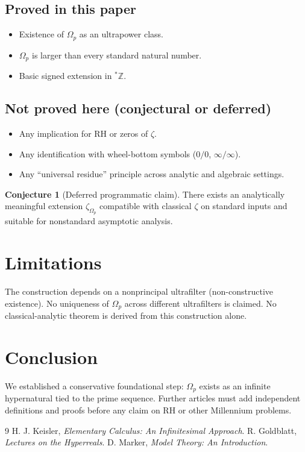 \documentclass[11pt]{article}
\theoremstyle{definition}
\newtheorem{conjecture}[definition]{Conjecture}
\theoremstyle{plain}
\begin{document}
\subsection*{Proved in this paper}
\begin{itemize}
\item Existence of \(\Omega_p\) as an ultrapower class.
\item \(\Omega_p\) is larger than every standard natural number.
\item Basic signed extension in \({}^\ast\mathbb Z\).
\end{itemize}

\subsection*{Not proved here (conjectural or deferred)}
\begin{itemize}
\item Any implication for RH or zeros of \(\zeta\).
\item Any identification with wheel-bottom symbols (\(0/0\), \(\infty/\infty\)).
\item Any ``universal residue'' principle across analytic and algebraic settings.
\end{itemize}

\begin{conjecture}[Deferred programmatic claim]
There exists an analytically meaningful extension \(\zeta_{\Omega_p}\) compatible with classical \(\zeta\) on standard inputs and suitable for nonstandard asymptotic analysis.
\end{conjecture}

\section{Limitations}
The construction depends on a nonprincipal ultrafilter (non-constructive existence).
No uniqueness of \(\Omega_p\) across different ultrafilters is claimed.
No classical-analytic theorem is derived from this construction alone.

\section{Conclusion}
We established a conservative foundational step: \(\Omega_p\) exists as an infinite hypernatural tied to the prime sequence.
Further articles must add independent definitions and proofs before any claim on RH or other Millennium problems.


\begin{thebibliography}{9}
 H. J. Keisler, \emph{Elementary Calculus: An Infinitesimal Approach}.
 R. Goldblatt, \emph{Lectures on the Hyperreals}.
 D. Marker, \emph{Model Theory: An Introduction}.
\end{thebibliography}
\end{document}
